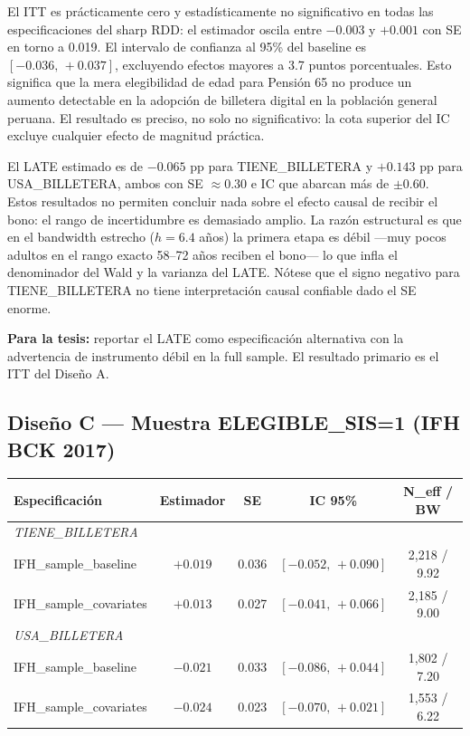 \documentclass[12pt, a4paper]{article}
\begin{document}
\begin{resultcaja}
El ITT es prácticamente cero y estadísticamente no significativo en todas
las especificaciones del sharp RDD: el estimador oscila entre $-0.003$ y
$+0.001$ con SE en torno a 0.019. El intervalo de confianza al 95\% del
baseline es $[-0.036,\, +0.037]$, excluyendo efectos mayores a 3.7 puntos
porcentuales. Esto significa que la mera elegibilidad de edad para Pensión
65 no produce un aumento detectable en la adopción de billetera digital en
la población general peruana. El resultado es preciso, no solo no
significativo: la cota superior del IC excluye cualquier efecto de magnitud
práctica.
\end{resultcaja}

\begin{resultcaja}
El LATE estimado es de $-0.065$ pp para TIENE\_BILLETERA y $+0.143$ pp para
USA\_BILLETERA, ambos con SE $\approx 0.30$ e IC que abarcan más de $\pm 0.60$.
Estos resultados no permiten concluir nada sobre el efecto causal de recibir
el bono: el rango de incertidumbre es demasiado amplio. La razón estructural
es que en el bandwidth estrecho ($h = 6.4$ años) la primera etapa es débil
---muy pocos adultos en el rango exacto 58--72 años reciben el bono---
lo que infla el denominador del Wald y la varianza del LATE. Nótese que el
signo negativo para TIENE\_BILLETERA no tiene interpretación causal confiable
dado el SE enorme.

\textbf{Para la tesis:} reportar el LATE como especificación alternativa con
la advertencia de instrumento débil en la full sample. El resultado primario
es el ITT del Diseño A.
\end{resultcaja}

\subsection{Diseño C — Muestra ELEGIBLE\_SIS=1 (IFH BCK 2017)}

\begin{center}
\begin{tabular}{lcccc}
\toprule
Especificación & Estimador & SE & IC 95\% & N\_eff / BW \\
\midrule
\multicolumn{5}{l}{\textit{TIENE\_BILLETERA}} \\
IFH\_sample\_baseline & $+0.019$ & 0.036 & $[-0.052,\,+0.090]$ & 2{,}218 / 9.92 \\
IFH\_sample\_covariates & $+0.013$ & 0.027 & $[-0.041,\,+0.066]$ & 2{,}185 / 9.00 \\
\multicolumn{5}{l}{\textit{USA\_BILLETERA}} \\
IFH\_sample\_baseline & $-0.021$ & 0.033 & $[-0.086,\,+0.044]$ & 1{,}802 / 7.20 \\
IFH\_sample\_covariates & $-0.024$ & 0.023 & $[-0.070,\,+0.021]$ & 1{,}553 / 6.22 \\
\bottomrule
\end{tabular}
\end{center}
\end{document}
